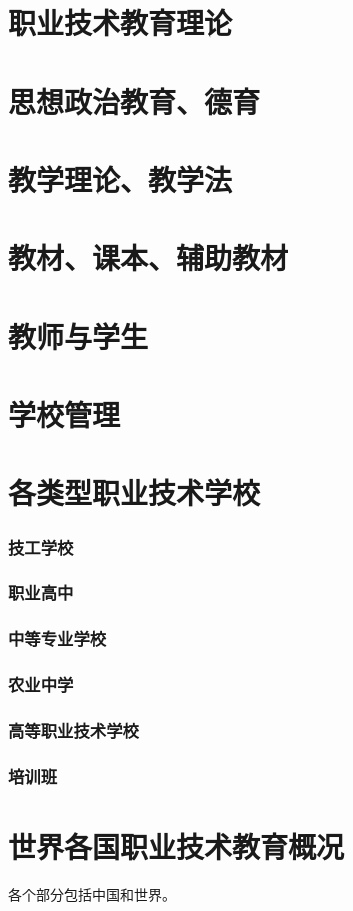 \documentclass[UTF8]{../../ApplicationUniverse}
\begin{document}
\section{职业技术教育理论}
\section{思想政治教育、德育}
\section{教学理论、教学法}
\section{教材、课本、辅助教材}
\section{教师与学生}
\section{学校管理}
\section{各类型职业技术学校}
    \subsubsection{技工学校}
    \subsubsection{职业高中}
    \subsubsection{中等专业学校}
    \subsubsection{农业中学}
    \subsubsection{高等职业技术学校}
    \subsubsection{培训班}
\section{世界各国职业技术教育概况}
各个部分包括中国和世界。
\end{document}
